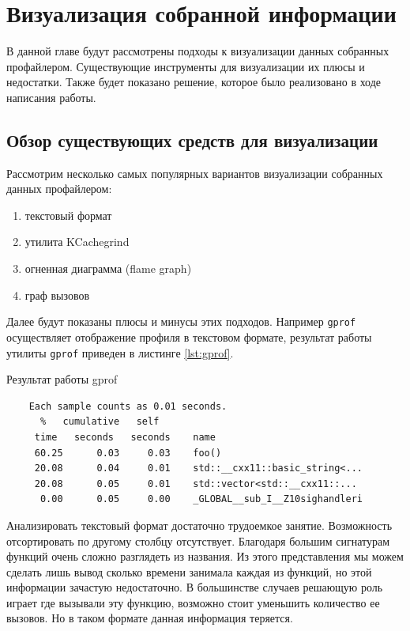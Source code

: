\chapter{Визуализация собранной информации}
	В данной главе будут рассмотрены подходы к визуализации данных собранных профайлером. Существующие инструменты для визуализации их плюсы и недостатки. Также будет показано решение, которое было реализовано в ходе написания работы. 

\section{Обзор существующих средств для визуализации}
	Рассмотрим несколько самых популярных вариантов визуализации собранных данных профайлером:
    \begin{enumerate}
    	\item текстовый формат
        \item утилита KCachegrind
        \item огненная диаграмма (flame graph)
        \item граф вызовов
    \end{enumerate}

	Далее будут показаны плюсы и минусы этих подходов. Например \verb|gprof| осуществляет отображение профиля в текстовом формате, результат работы утилиты \verb|gprof| приведен в листинге \ref{lst:gprof}.
    
\begin{algorithm}[!h]
  \caption{Результат работы gprof}
  \label{lst:gprof}
  \begin{lstlisting}
    Each sample counts as 0.01 seconds.
      %   cumulative   self              
     time   seconds   seconds    name    
     60.25      0.03     0.03    foo()
     20.08      0.04     0.01    std::__cxx11::basic_string<...
     20.08      0.05     0.01    std::vector<std::__cxx11::...
      0.00      0.05     0.00    _GLOBAL__sub_I__Z10sighandleri
  \end{lstlisting}
\end{algorithm}

	Анализировать текстовый формат достаточно трудоемкое занятие. Возможность отсортировать по другому столбцу отсутствует. Благодаря большим сигнатурам функций очень сложно разглядеть из названия. Из этого представления мы можем сделать лишь вывод сколько времени занимала каждая из функций, но этой информации зачастую недостаточно. В большинстве случаев решающую роль играет где вызывали эту функцию, возможно стоит уменьшить количество ее вызовов. Но в таком формате данная информация теряется. 
    
